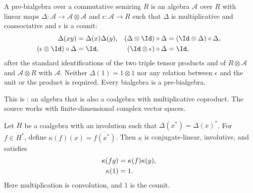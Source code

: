 \begin{definition}
    \label{def:mpoalg_pre_bialgebra}
    \leanok
    A pre-bialgebra over a commutative semiring $R$ is an algebra
    $\mathcal A$ over $R$ with linear maps
    $\Delta\colon\mathcal A\to\mathcal A\otimes\mathcal A$ and
    $\epsilon\colon\mathcal A\to R$ such that $\Delta$ is multiplicative and
    coassociative and $\epsilon$ is a counit:
    \begin{align}
        \Delta(xy)                    & =\Delta(x)\Delta(y),            &
        (\Delta\otimes\Id)\circ\Delta & =(\Id\otimes\Delta)\circ\Delta,
        \label{eq:mpoalg_pre_bialgebra}                                   \\
        (\epsilon\otimes\Id)\circ\Delta
                                      & =\Id,                           &
        (\Id\otimes\epsilon)\circ\Delta
                                      & =\Id,
        \label{eq:mpoalg_pre_bialgebra_counit}
    \end{align}
    after the standard identifications of the two triple tensor products and
    of $R\otimes\mathcal A$ and $\mathcal A\otimes R$ with $\mathcal A$.
    Neither $\Delta(1)=1\otimes1$ nor any relation between $\epsilon$
    and the unit or the product is required. Every bialgebra is a
    pre-bialgebra.

    This is \cite[Definition~4.1]{Molnar2022MPOAlgebrasI}: an algebra that is
    also a coalgebra \cite[Definition~3.1]{Molnar2022MPOAlgebrasI} with
    multiplicative coproduct. The source works with finite-dimensional
    complex vector spaces.
\end{definition}

\begin{lemma}
    \label{thm:glm_coalgebra_dual_star}
    \leanok
    Let $H$ be a coalgebra with an involution such that
    $\Delta(x^*)=\Delta(x)^*$. For $f\in H^*$, define
    $\kappa(f)(x)=\overline{f(x^*)}$. Then $\kappa$ is conjugate-linear,
    involutive, and satisfies
    \begin{align}
        \kappa(fg) & =\kappa(f)\kappa(g), \notag \\
        \kappa(1)  & =1.
        \label{eq:glm_dual_star_product}
    \end{align}
    Here multiplication is convolution, and $1$ is the counit.
\end{lemma}

